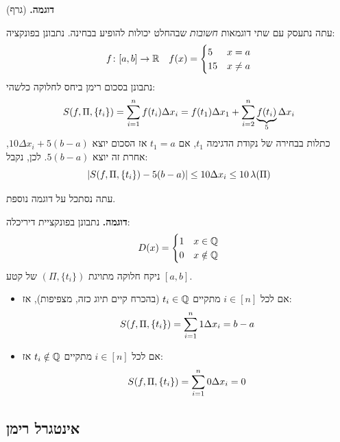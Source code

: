 \documentclass[]{../../../../tex/classes/styledArticle}
\begin{document}
	\textbf{דוגמה. }(גרף)
	
	
	עתה נתעסק עם שתי דוגמאות \textit{חשובות} שבהחלט יכולות להופיע בבחינה. נתבונן בפונקציה: 
	\begin{align*}
		f \colon [a, b] \to \mathbb{R} && f(x) = \begin{cases}
			5 & x = a \\
			15 & x \neq a
		\end{cases}
	\end{align*}
	נתבונן בסכום רימן ביחס לחלוקה כלשהי: 
	\[ S(f, \Pi, \{t_i\}) = \sum_{i = 1}^{n}f(t_i)\Delta x_i = f(t_1)\Delta x_1 + \sum_{i = 2}^{n}\underbrace{f(t_i)}_{5}\Delta x_i \]
	כתלות בבחירה של נקודת הדגימה $t_1$, אם $t_1= a$ אז הסכום יוצא $10 \Delta x_i + 5(b - a)$, אחרת זה יוצא $5(b - a)$. לכן, נקבל: 
	\[ \left \lvert S(f, \Pi, \{t_i\}) - 5(b - a) \right \rvert \le 10 \Delta x_i \le 10 \, \lambda(\Pi) \]
	
	עתה נסתכל על דוגמה נוספת. 
	
	\textbf{דוגמה. }נתבונן בפונקציית דיריכלה: 
	\[ D(x) = \begin{cases}
		1 & x \in \mathbb{Q} \\
		0 & x \notin \mathbb{Q}
	\end{cases} \]
	ניקח חלוקה מתויגת $(\Pi, \{t_i\})$ של קטע $[a, b]$. 
	\begin{itemize}
		\item אם לכל $i \in [n]$ מתקיים $t_i \in \mathbb{Q}$ (בהכרח קיים תיוג כזה, מצפיפות), אז:
		\[ S(f, \Pi, \{t_i\}) = \sum_{i = 1}^{n} 1 \Delta x_i = b - a \]
		\item אם לכל $i \in [n]$ מתקיים $t_i \notin \mathbb{Q}$ אז: 
		\[ S(f, \Pi, \{t_i\}) = \sum_{i = 1}^{n} 0 \Delta x_i = 0 \]
	\end{itemize}
	
	
	\subsection*{אינטגרל רימן}
	
\end{document}
